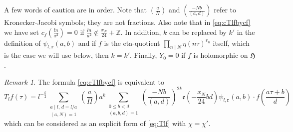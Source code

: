 \documentclass[12pt]{amsart}
\numberwithin{equation}{section}
\theoremstyle{plain}
\theoremstyle{definition}
\theoremstyle{remark}
\newtheorem{rema}[thm]{Remark}
\newcommand\twoscript[2]{\substack{{#1} \\ {#2}}}
\newcommand\legendre[2]{\genfrac{(}{)}{}{}{#1}{#2}}
\newcommand\etp[1]{\mathfrak{e}\left(#1\right)}
\newcommand\numZ{\mathbb{Z}}
\newcommand\uhp{\mathfrak{H}}
\begin{document}
A few words of caution are in order. Note that $\legendre{a}{\varPi}$ and $\legendre{-Nb}{(a,d)}$ refer to Kronecker-Jacobi symbols; they are not fractions. Also note that in \eqref{eq:cTlfbycf} we have set $c_f\left(\frac{ln}{a^2}\right)=0$ if $\frac{ln}{a^2}\not\in\frac{x_N}{24}+\numZ$. In addition, $k$ can be replaced by $k'$ in the definition of $\psi_{l,\mathbf{r}}(a,b)$ and if $f$ is the eta-quotient $\prod_{n\mid N}\eta(n\tau)^{r_n}$ itself, which is the case we will use below, then $k=k'$. Finally, $Y_0=0$ if $f$ is holomorphic on $\uhp$.
\begin{rema}
\label{rema:Tlfexplicit}
The formula \eqref{eq:cTlfbycf} is equivalent to
\begin{equation}
\label{eq:Tlfexplicit}
T_lf(\tau)=l^{-\frac{k}{2}}\sum_{\twoscript{a\mid l,\,d=l/a}{(a,N)=1}}\legendre{a}{\varPi}a^k\sum_{\twoscript{0\leq b<d}{(a,b,d)=1}}\legendre{-Nb}{(a,d)}^{2k}\etp{-\frac{x_N}{24}bd}\psi_{l,\mathbf{r}}(a,b)\cdot f\left(\frac{a\tau+b}{d}\right)
\end{equation}
which can be considered as an explicit form of \eqref{eq:Tlf} with $\chi=\chi'$.
\end{rema}
\end{document}
